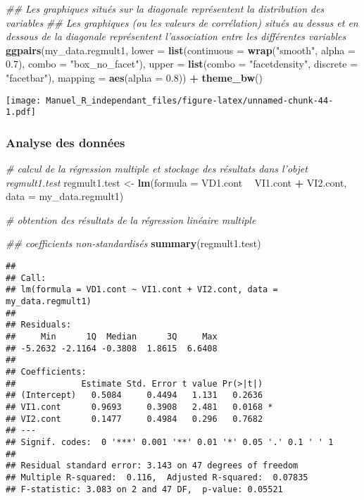 \documentclass[
]{book}
\newenvironment{Shaded}{\begin{snugshade}}{\end{snugshade}}
\newcommand{\CommentTok}[1]{\textcolor[rgb]{0.56,0.35,0.01}{\textit{#1}}}
\newcommand{\DataTypeTok}[1]{\textcolor[rgb]{0.13,0.29,0.53}{#1}}
\newcommand{\FloatTok}[1]{\textcolor[rgb]{0.00,0.00,0.81}{#1}}
\newcommand{\KeywordTok}[1]{\textcolor[rgb]{0.13,0.29,0.53}{\textbf{#1}}}
\newcommand{\NormalTok}[1]{#1}
\newcommand{\OperatorTok}[1]{\textcolor[rgb]{0.81,0.36,0.00}{\textbf{#1}}}
\newcommand{\StringTok}[1]{\textcolor[rgb]{0.31,0.60,0.02}{#1}}
\begin{document}
\begin{Shaded}
\begin{Highlighting}[]
\CommentTok{## Les graphiques situés sur la diagonale représentent la distribution des variables}
\CommentTok{## Les graphiques (ou les valeurs de corrélation) situés au dessus et en dessous de la diagonale représentent l'association entre les différentes variables}
\KeywordTok{ggpairs}\NormalTok{(my_data.regmult1,}
        \DataTypeTok{lower =} \KeywordTok{list}\NormalTok{(}\DataTypeTok{continuous =} \KeywordTok{wrap}\NormalTok{(}\StringTok{"smooth"}\NormalTok{, }\DataTypeTok{alpha =} \FloatTok{0.7}\NormalTok{), }\DataTypeTok{combo =} \StringTok{"box_no_facet"}\NormalTok{),}
        \DataTypeTok{upper =} \KeywordTok{list}\NormalTok{(}\DataTypeTok{combo =} \StringTok{"facetdensity"}\NormalTok{, }\DataTypeTok{discrete =} \StringTok{"facetbar"}\NormalTok{), }
        \DataTypeTok{mapping =} \KeywordTok{aes}\NormalTok{(}\DataTypeTok{alpha =} \FloatTok{0.8}\NormalTok{)) }\OperatorTok{+}\StringTok{ }\KeywordTok{theme_bw}\NormalTok{()}
\end{Highlighting}
\end{Shaded}

\texttt{[image: Manuel\_R\_independant\_files/figure-latex/unnamed-chunk-44-1.pdf]}

\hypertarget{analyse-des-donnuxe9es-4}{%
\subsubsection{Analyse des données}\label{analyse-des-donnuxe9es-4}}

\begin{Shaded}
\begin{Highlighting}[]
\CommentTok{# calcul de la régression multiple et stockage des résultats dans l’objet regmult1.test}
\NormalTok{regmult1.test <-}\StringTok{ }\KeywordTok{lm}\NormalTok{(}\DataTypeTok{formula =}\NormalTok{ VD1.cont }\OperatorTok{~}\StringTok{ }\NormalTok{VI1.cont }\OperatorTok{+}\StringTok{ }\NormalTok{VI2.cont, }
                 \DataTypeTok{data =}\NormalTok{ my_data.regmult1)}

\CommentTok{# obtention des résultats de la régression linéaire multiple }

\CommentTok{## coefficients non-standardisés}
\KeywordTok{summary}\NormalTok{(regmult1.test)}
\end{Highlighting}
\end{Shaded}

\begin{verbatim}
## 
## Call:
## lm(formula = VD1.cont ~ VI1.cont + VI2.cont, data = my_data.regmult1)
## 
## Residuals:
##     Min      1Q  Median      3Q     Max 
## -5.2632 -2.1164 -0.3808  1.8615  6.6408 
## 
## Coefficients:
##             Estimate Std. Error t value Pr(>|t|)  
## (Intercept)   0.5084     0.4494   1.131   0.2636  
## VI1.cont      0.9693     0.3908   2.481   0.0168 *
## VI2.cont      0.1477     0.4984   0.296   0.7682  
## ---
## Signif. codes:  0 '***' 0.001 '**' 0.01 '*' 0.05 '.' 0.1 ' ' 1
## 
## Residual standard error: 3.143 on 47 degrees of freedom
## Multiple R-squared:  0.116,	Adjusted R-squared:  0.07835 
## F-statistic: 3.083 on 2 and 47 DF,  p-value: 0.05521
\end{verbatim}
\end{document}
